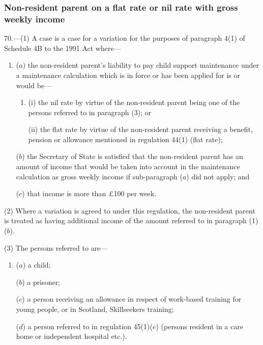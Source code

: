 \documentclass[12pt,a4paper]{article}
\begin{document}

\subsubsection[70. Non-resident parent on a flat rate or nil rate with gross weekly income]{Non-resident parent on a flat rate or nil rate with gross weekly income}

70.---(1)  A case is a case for a variation for the purposes of paragraph 4(1) of Schedule 4B to the 1991 Act where—
\begin{enumerate}\item[]
($a$) the non-resident parent’s liability to pay child support maintenance under a maintenance calculation which is in force or has been applied for is or would be—
\begin{enumerate}\item[]
(i) the nil rate by virtue of the non-resident parent being one of the persons referred to in paragraph (3); or

(ii) the flat rate by virtue of the non-resident parent receiving a benefit, pension or allowance mentioned in regulation 44(1) (flat rate);
\end{enumerate}

($b$) the Secretary of State is satisfied that the non-resident parent has an amount of income that would be taken into account in the maintenance calculation as gross weekly income if sub-paragraph ($a$)  did not apply; and

($c$) that income is 
more than £100 per week.
\end{enumerate}

(2) Where a variation is agreed to under this regulation, the non-resident parent is treated as having additional income of the amount referred to in paragraph (1)($b$).

(3) The persons referred to are—
\begin{enumerate}\item[]
($a$) a child;

($b$) a prisoner;

($c$) a person receiving an allowance in respect of work-based training for young people, or in Scotland, Skillseekers training;

($d$) a person referred to in regulation 45(1)($e$)  (persons resident in a care home or independent hospital etc.).
\end{enumerate}
\end{document}
